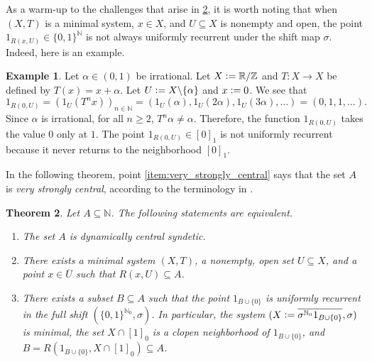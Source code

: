 \documentclass[letter,11pt]{article}
\theoremstyle{plain}
\newtheorem{theorem}{Theorem}
\theoremstyle{definition}
\newtheorem{example}[theorem]{Example}
\theoremstyle{plain}
\theoremstyle{plain}
\numberwithin{equation}{section}
\newcommand{\N}{\mathbb{N}}
\newcommand{\Z}{\mathbb{Z}}
\newcommand{\R}{\mathbb{R}}
\newcommand{\defeq}{\vcentcolon=}
\renewcommand{\geq}{\geqslant}
\renewcommand{\setminus}{\backslash}
\begin{document}
As a warm-up to the challenges that arise in \cref{thm:simple_equivalent_dcS}, it is worth noting that when $(X,T)$ is a minimal system, $x \in X$, and $U \subseteq X$ is nonempty and open, the point $1_{R(x,U)} \in \{0,1\}^{\N}$ is not always uniformly recurrent under the shift map $\sigma$.  Indeed, here is an example.

\begin{example}
\label{ex:never_repeat}
    Let $\alpha \in (0, 1)$ be irrational.  Let $X \defeq \R / \Z$ and $T: X \to X$ be defined by $T(x) = x + \alpha$.  Let $U \defeq X \setminus \{\alpha\}$ and $x \defeq 0$. We see that
    \[
        1_{R(0,U)} = (1_{U}(T^n x))_{n \in \N} = (1_U( \alpha), 1_U(2 \alpha), 1_U(3 \alpha), \ldots) = (0, 1, 1, \ldots).
    \]
    Since $\alpha$ is irrational, for all $n \geq 2$, $T^n \alpha \neq \alpha$. Therefore, the function $1_{R(0,U)}$ takes the value $0$ only at $1$.  The point $1_{R(0,U)} \in [0]_1$ is not uniformly recurrent because it never returns to the neighborhood $[0]_1$.
\end{example}



In the following theorem, point \eqref{item:very_strongly_central} says that the set $A$ is \emph{very strongly central}, according to the terminology in \cite[Def. 2.10]{bergelson_hindman_strauss_2012}.

\begin{theorem}
\label{thm:simple_equivalent_dcS}
    Let $A \subseteq \N$. The following statements are equivalent.
    \begin{enumerate}
        \item \label{item:dcsyndetic} The set $A$ is dynamically central syndetic.  

        \item \label{item:very_strongly_central}
        There exists a minimal system $(X,T)$, a nonempty, open set $U \subseteq X$, and a point $x \in \overline{U}$ such that $R(x,U) \subseteq A$.
        
        
        \item \label{item:1_A_0_uniformly_recurrent} There exists a subset $B \subseteq A$ such that the point $1_{B \cup \{0\}}$ is uniformly recurrent in the full shift $(\{0, 1\}^{\N_0}, \sigma)$. In particular, the system $(X \defeq \overline{\sigma^{\N_0} 1_{B \cup \{0\}}}, \sigma)$ is minimal, the set $X \cap [1]_0$ is a clopen neighborhood of $1_{B \cup \{0\}}$, and $B = R(1_{B \cup \{0\}}, X \cap [1]_0) \subseteq A$.
    \end{enumerate}
\end{theorem}
\end{document}

